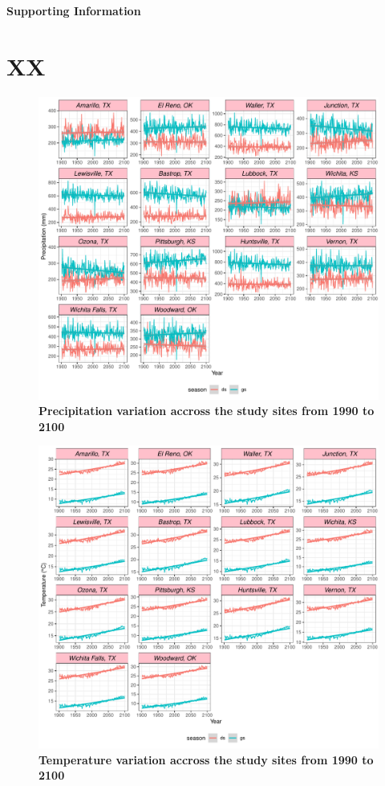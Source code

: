 \documentclass[12pt]{article}
\begin{document}
\centerline{\Large{\textbf{Supporting Information}}}

\section {XX}	

\begin{figure}[h!]
		\centering
		\includegraphics[width=0.95\linewidth]{Figures/fig_pr_past_present_future.pdf}
		\caption{\textbf{Precipitation variation accross the study sites from 1990 to 2100}}
		\label{Sup:pr_variation}
\end{figure}


\begin{figure}[h!]
		\centering
		\includegraphics[width=0.95\linewidth]{Figures/fig_tas_past_present_future.pdf}
		\caption{\textbf{Temperature variation accross the study sites from 1990 to 2100}}
		\label{Sup:temp_variation}
\end{figure}
\end{document}
